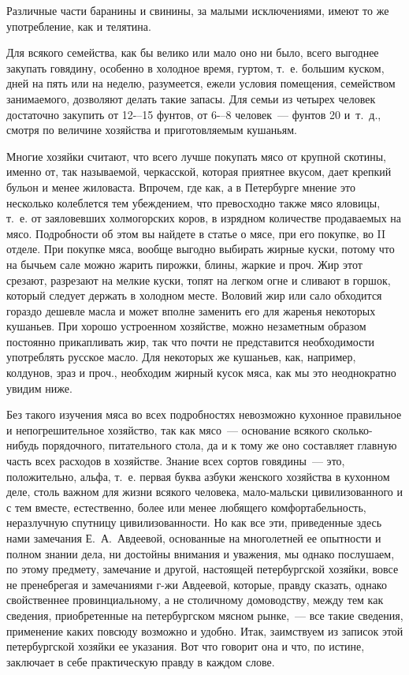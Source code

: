 Различные части баранины и свинины, за малыми исключениями, имеют то же употребление, как и телятина.

Для всякого семейства, как бы велико или мало оно ни было, всего выгоднее закупать говядину, особенно в холодное время, гуртом, т.~е. большим куском, дней на пять или на неделю, разумеется, ежели условия помещения, семейством занимаемого, дозволяют делать такие запасы. Для семьи из четырех человек достаточно закупить от 12-–15 фунтов, от 6-–8 человек~--- фунтов 20 и~т.~д., смотря по величине хозяйства и приготовляемым кушаньям.

Многие хозяйки считают, что всего лучше покупать мясо от крупной скотины, именно от, так называемой, черкасской, которая приятнее вкусом, дает крепкий бульон и менее жиловаста. Впрочем, где как, а в Петербурге мнение это несколько колеблется тем убеждением, что превосходно также мясо яловицы, т.~е. от заяловевших холмогорских коров, в изрядном количестве продаваемых на мясо. Подробности об этом вы найдете в статье о мясе, при его покупке, во II отделе. При покупке мяса, вообще выгодно выбирать жирные куски, потому что на бычьем сале можно жарить пирожки, блины, жаркие и проч. Жир этот срезают, разрезают на мелкие куски, топят на легком огне и сливают в горшок, который следует держать в холодном месте. Воловий жир или сало обходится гораздо дешевле масла и может вполне заменить его для жаренья некоторых кушаньев. При хорошо устроенном хозяйстве, можно незаметным образом постоянно прикапливать жир, так что почти не представится необходимости употреблять русское масло. Для некоторых же кушаньев, как, например, колдунов, зраз и проч., необходим жирный кусок мяса, как мы это неоднократно увидим ниже.

Без такого изучения мяса во всех подробностях невозможно кухонное правильное и непогрешительное хозяйство, так как мясо~--- основание всякого сколько-нибудь порядочного, питательного стола, да и к тому же оно составляет главную часть всех расходов в хозяйстве. Знание всех сортов говядины~--- это, положительно, альфа, т.~е. первая буква азбуки женского хозяйства в кухонном деле, столь важном для жизни всякого человека, мало-мальски цивилизованного и с тем вместе, естественно, более или менее любящего комфортабельность, неразлучную спутницу цивилизованности. Но как все эти, приведенные здесь нами замечания Е.~А.~Авдеевой, основанные на многолетней ее опытности и полном знании дела, ни достойны внимания и уважения, мы однако послушаем, по этому предмету, замечание и другой, настоящей петербургской хозяйки, вовсе не пренебрегая и замечаниями г-жи Авдеевой, которые, правду сказать, однако свойственнее провинциальному, а не столичному домоводству, между тем как сведения, приобретенные на петербургском мясном рынке,~--- все такие сведения, применение каких повсюду возможно и удобно. Итак, заимствуем из записок этой петербургской хозяйки ее указания. Вот что говорит она и что, по истине, заключает в себе практическую правду в каждом слове.

